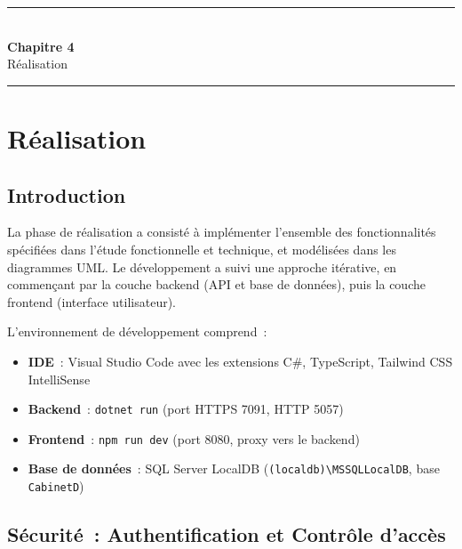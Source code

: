 
\clearpage
\thispagestyle{chaptertitlepage}
\vspace*{\fill}
\begin{center}
\rule{\textwidth}{0.4pt}\\[0.8cm]
{\fontsize{24}{29}\selectfont\bfseries Chapitre 4}\\[0.6cm]
{\fontsize{18}{22}\selectfont Réalisation}\\[0.8cm]
\rule{\textwidth}{0.4pt}
\end{center}
\vspace*{\fill}
\clearpage

\chapter{Réalisation}

\section{Introduction}

La phase de réalisation a consisté à implémenter l'ensemble des fonctionnalités spécifiées dans l'étude fonctionnelle et technique, et modélisées dans les diagrammes UML. Le développement a suivi une approche itérative, en commençant par la couche backend (API et base de données), puis la couche frontend (interface utilisateur).

L'environnement de développement comprend~:
\begin{itemize}
    \item \textbf{IDE}~: Visual Studio Code avec les extensions C\#, TypeScript, Tailwind CSS IntelliSense
    \item \textbf{Backend}~: \texttt{dotnet run} (port HTTPS 7091, HTTP 5057)
    \item \textbf{Frontend}~: \texttt{npm run dev} (port 8080, proxy vers le backend)
    \item \textbf{Base de données}~: SQL Server LocalDB (\texttt{(localdb)\textbackslash MSSQLLocalDB}, base \texttt{CabinetD})
\end{itemize}

\section{Sécurité~: Authentification et Contrôle d'accès}

